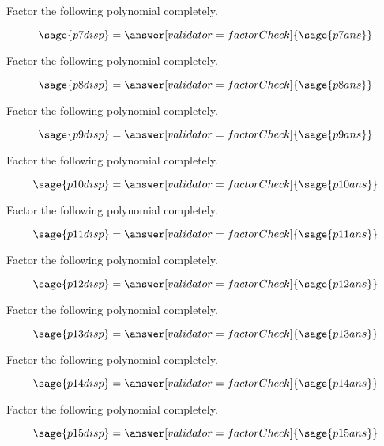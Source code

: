 \documentclass{ximera}
\begin{document}
\begin{problem}
    Factor the following polynomial completely.

\[
    \sage{p7disp} = \answer[validator=factorCheck]{\sage{p7ans}}
\]
\end{problem}




\begin{problem}
    Factor the following polynomial completely.

\[
    \sage{p8disp} = \answer[validator=factorCheck]{\sage{p8ans}}
\]
\end{problem}




\begin{problem}
    Factor the following polynomial completely.

\[
    \sage{p9disp} = \answer[validator=factorCheck]{\sage{p9ans}}
\]
\end{problem}




\begin{problem}
    Factor the following polynomial completely.

\[
    \sage{p10disp} = \answer[validator=factorCheck]{\sage{p10ans}}
\]
\end{problem}




\begin{problem}
    Factor the following polynomial completely.

\[
    \sage{p11disp} = \answer[validator=factorCheck]{\sage{p11ans}}
\]
\end{problem}




\begin{problem}
    Factor the following polynomial completely.

\[
    \sage{p12disp} = \answer[validator=factorCheck]{\sage{p12ans}}
\]
\end{problem}




\begin{problem}
    Factor the following polynomial completely.

\[
    \sage{p13disp} = \answer[validator=factorCheck]{\sage{p13ans}}
\]
\end{problem}




\begin{problem}
    Factor the following polynomial completely.

\[
    \sage{p14disp} = \answer[validator=factorCheck]{\sage{p14ans}}
\]
\end{problem}




\begin{problem}
    Factor the following polynomial completely.

\[
    \sage{p15disp} = \answer[validator=factorCheck]{\sage{p15ans}}
\]
\end{problem}
\end{document}
